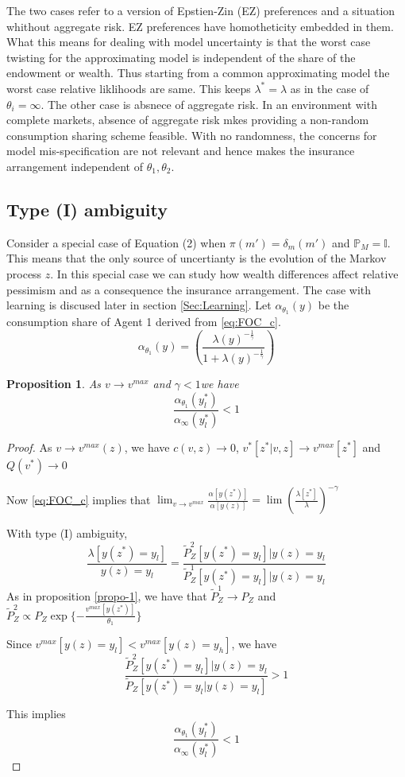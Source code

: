 \documentclass[12pt]{article}
\newtheorem{proposition}{Proposition}
\begin{document}
The two cases refer to a version of Epstien-Zin (EZ) preferences and a situation whithout aggregate risk. EZ preferences have homotheticity embedded in them. What this means for dealing with model uncertainty is that the worst case twisting for the  approximating model is independent of the share of the endowment or wealth. Thus starting from a common approximating model the worst case relative liklihoods are same. This keeps $\lambda^*=\lambda$ as in the case of $\theta_{i}=\infty$. The other case is absnece of aggregate risk. In an environment with complete markets, absence of aggregate risk mkes providing a non-random consumption sharing scheme feasible. With no randomness, the concerns for model mis-specification are not relevant and hence makes the insurance arrangement independent of $\theta_1,\theta_2$.

\subsection{Type (I) ambiguity}
Consider a special case of  Equation (2) when $\pi(m')=\delta_{m}(m')$ and $\mathbb{P}_M=\mathbb{I}$. This means that the only source of uncertianty is the evolution of the Markov process $z$. In this special case we can study how wealth differences affect relative pessimism and as a consequence the insurance arrangement. The case with learning is discused later in section \ref{Sec:Learning}. Let $\alpha_{\theta_1}(y)$ be the consumption share of Agent 1 derived from \ref{eq:FOC_c}. 
\[\alpha_{\theta_1}(y)=\left(\frac{\lambda(y)^{-\frac{1}{\gamma}}}{1+\lambda(y)^{-\frac{1}{\gamma}}}\right)\]

\begin{proposition}
\label{propo-4}
As $v\to v^{max}$ and $\gamma < 1$we have 
\[\frac{\alpha_{\theta_1}(y^*_l)}{\alpha_{\infty}(y^*_l)} < 1\]
\end{proposition}
\begin{proof}
As $v \to v^{max}(z)$, we have $c(v,z)\to 0$, $v^{*}[z^*|v,z] \to v^{max}[z^*]$ and $Q(v^*) \to 0$

Now \ref{eq:FOC_c} implies that $\lim_{v \to v^{max}} \frac{\alpha[y(z^*)]}{\alpha[y(z)]}=\lim \left(\frac{\lambda[z^*]}{\lambda}\right)^{-\gamma}$

With type (I) ambiguity, 
\[\frac{\lambda[y(z^*)=y_l]}{y(z)=y_l} =\frac{\tilde{P}^2_Z[y(z^*)=y_l]|y(z)=y_l}{\tilde{P}^1_Z[y(z^*)=y_l]|y(z)=y_l}\]
As in proposition \ref{propo-1}, we have that $\tilde{P}^1_Z \to P_Z$ and $\tilde{P}^2_Z \propto P_Z \exp\{-\frac{v^{max}[y(z^*)]}{\theta_1}\}$

Since $v^{max}[y(z)=y_l] < v^{max}[y(z)=y_h]$, we have
\[\frac{\tilde{P}^2_Z[y(z^*)=y_l]|y(z)=y_l}{\tilde{P}_Z[y(z^*)=y_l|y(z)=y_l]} >1\]

This implies 
\[\frac{\alpha_{\theta_1}(y^*_l)}{\alpha_{\infty}(y^*_l)} < 1\]
\end{proof}
\end{document}
